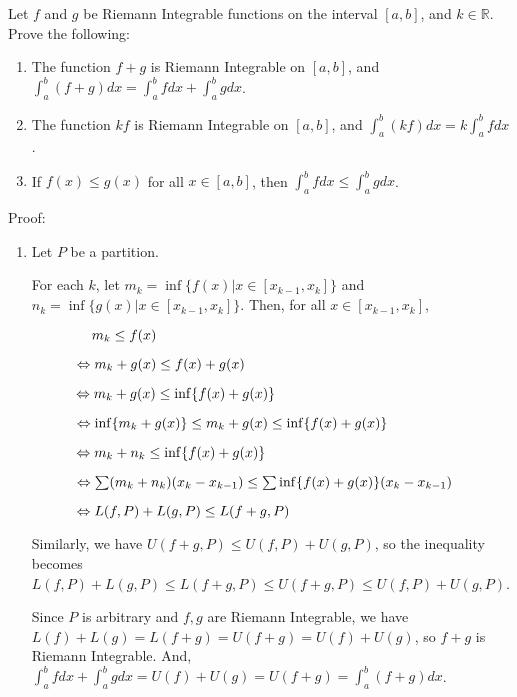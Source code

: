 \documentclass{article}
\begin{document}
Let $f$ and $g$ be Riemann Integrable functions on the interval $[a,b]$, and $k\in\mathbb{R}$.  Prove the following:
\begin{enumerate}
\item The function $f+g$ is Riemann Integrable on $[a,b]$, and $\int_a^b(f+g)dx=\int_a^bfdx+\int_a^bgdx$.
\item The function $kf$ is Riemann Integrable on $[a,b]$, and $\int_a^b(kf)dx=k\int_a^bfdx$.
\item If $f(x)\leq g(x)$ for all $x\in[a,b]$, then $\int_a^bfdx\leq\int_a^bgdx$.
\end{enumerate}

Proof:

\begin{enumerate}
    \item Let $P$ be a partition. 

    For each $k$, let $m_k = \inf\{f(x) | x \in [x_{k-1}, x_k]\}$ and $n_k= \inf\{g(x) | x \in [x_{k-1}, x_k]\}$. Then, for all $x \in [x_{k-1}, x_k]$, 
    
    $\hspace{1.5cm}m_k \le f(x)$

    $\hspace{1.1cm} \Leftrightarrow m_k + g(x) \le f(x) + g(x)$

    $\hspace{1.1cm} \Leftrightarrow m_k + g(x) \le \inf\{f(x) +g(x)\}$

    $\hspace{1.1cm} \Leftrightarrow \inf\{m_k + g(x)\} \le m_k + g(x) \le \inf\{f(x) +g(x)\}$

    $\hspace{1.1cm} \Leftrightarrow m_k + n_k \le \inf\{f(x) +g(x)\}$

    $\hspace{1.1cm} \Leftrightarrow \sum (m_k + n_k)(x_{k}-x_{k-1}) \le \sum\inf\{f(x) +g(x)\}(x_k - x_{k-1})$

    $\hspace{1.1cm} \Leftrightarrow L(f, P) + L(g, P) \le L(f+g, P)$

    Similarly, we have $U(f+g, P) \le U(f,P) + U(g,P)$, so the inequality becomes $L(f, P) + L(g, P) \le L(f+g, P) \le U(f+g, P) \le U(f,P) + U(g,P)$. 
    
    Since $P$ is arbitrary and $f, g$ are Riemann Integrable, we have \\$L(f) + L(g) = L(f+g) = U(f+g) = U(f) + U(g)$, so $f+g$ is Riemann Integrable. And, $\int_a^bfdx+\int_a^bgdx = U(f) + U(g) = U(f+g) = \int_a^b(f+g)dx$. 


\end{enumerate}
\end{document}
